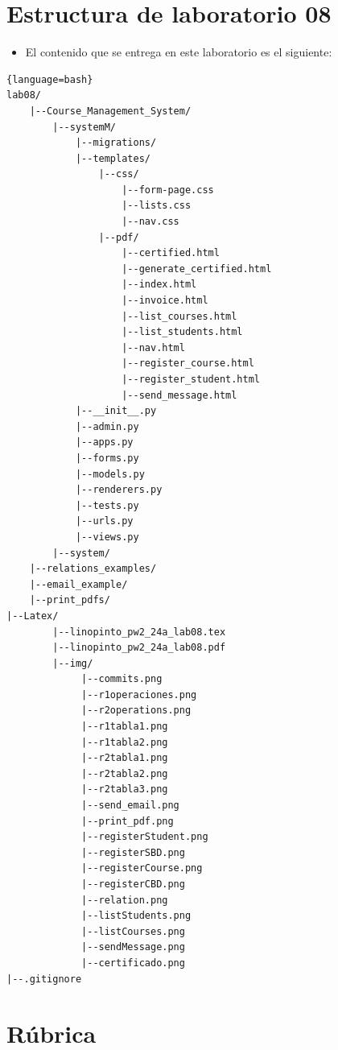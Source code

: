 \documentclass{article}
\newcommand{\itemPracticeNumber}{08}
\begin{document}
\section{Estructura de laboratorio \itemPracticeNumber}
\begin{itemize}
	\item El contenido que se entrega en este laboratorio es el siguiente:
\end{itemize}
\begin{lstlisting}{language=bash}
lab08/
	|--Course_Management_System/
		|--systemM/
			|--migrations/
			|--templates/
				|--css/
					|--form-page.css
					|--lists.css
					|--nav.css
				|--pdf/
					|--certified.html
					|--generate_certified.html
					|--index.html
					|--invoice.html
					|--list_courses.html
					|--list_students.html
					|--nav.html
					|--register_course.html
					|--register_student.html
					|--send_message.html
			|--__init__.py
			|--admin.py
			|--apps.py
			|--forms.py
			|--models.py
			|--renderers.py
			|--tests.py
			|--urls.py
			|--views.py
		|--system/
	|--relations_examples/
	|--email_example/
	|--print_pdfs/
|--Latex/
		|--linopinto_pw2_24a_lab08.tex
		|--linopinto_pw2_24a_lab08.pdf
		|--img/
			 |--commits.png
			 |--r1operaciones.png
			 |--r2operations.png
			 |--r1tabla1.png
			 |--r1tabla2.png
			 |--r2tabla1.png
			 |--r2tabla2.png
			 |--r2tabla3.png
			 |--send_email.png
			 |--print_pdf.png
			 |--registerStudent.png
			 |--registerSBD.png
			 |--registerCourse.png
			 |--registerCBD.png
			 |--relation.png
			 |--listStudents.png
			 |--listCourses.png
			 |--sendMessage.png
			 |--certificado.png
|--.gitignore
\end{lstlisting}
\section{Rúbrica}
\end{document}
